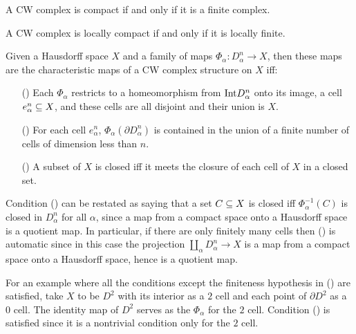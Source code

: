 \begin{corollary}\label{CW compact iff}
A CW complex is compact if and only if it is a finite complex.
\end{corollary}
\begin{proposition}\label{CW locally compact iff}
A CW complex is locally compact if and only if it is locally finite.
\end{proposition}
\begin{proposition}\label{CW maps are char map iff}
Given a Hausdorff space $X$ and a family of maps $\varPhi_\alpha:D^n_\alpha\to X$, then these maps are the characteristic maps of a CW complex structure on $X$ iff:
\begin{itemize}
\item[(\rmnum{1})]Each $\varPhi_\alpha$ restricts to a homeomorphism from $\mathrm{Int} D^n_\alpha$ onto its image, a cell $e^n_\alpha\subseteq X$, and these cells are all disjoint 
and their union is $X$.
\item[(\rmnum{2})]For each cell $e^n_\alpha$, $\varPhi_\alpha(\partial D^n_\alpha)$ is contained in the union of a finite number of cells of dimension less than $n$.
\item[(\rmnum{3})]A subset of $X$ is closed iff it meets the closure of each cell of $X$ in a closed set.
\end{itemize}
\end{proposition}
Condition () can be restated as saying that a set $C\subseteq X$ is closed iff $\varPhi^{-1}_\alpha(C)$ is closed in $D^n_\alpha$ for all $\alpha$, since a map from 
a compact space onto a Hausdorff space is a quotient map. In particular, if there are only finitely many cells then () is automatic since in this case the 
projection $\coprod_\alpha D^n_\alpha\to X$ is a map from a compact space onto a Hausdorff space, hence is a quotient map.\par
For an example where all the conditions except the finiteness hypothesis in () are satisfied, take $X$ to be $D^2$ with its interior as a $2$ cell and each 
point of $\partial D^2$ as a $0$ cell. The identity map of $D^2$ serves as the $\varPhi_\alpha$ for the $2$ cell. Condition () is satisfied since it is a 
nontrivial condition only for the $2$ cell.
